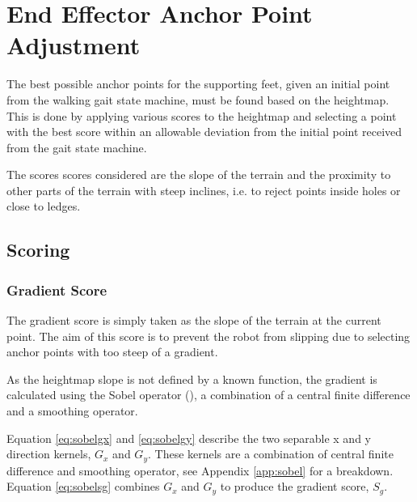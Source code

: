 \chapter{End Effector Anchor Point Adjustment} \label{chap:effector-placement}
The best possible anchor points for the supporting feet, given an initial point from the walking
gait state machine, must be found based on the heightmap. This is done by applying various
scores to the heightmap and selecting a point with the best score within an allowable
deviation from the initial point received from the gait state machine.

The scores scores considered are the slope of the terrain and the proximity to other parts of the terrain with steep inclines,
i.e. to reject points inside holes or close to ledges.


\section{Scoring}
    \subsection{Gradient Score}
        The gradient score is simply taken as the slope of the terrain at the current point. The aim of this score is to prevent the robot from slipping due to
        selecting anchor points with too steep of a gradient.
        
        As the heightmap slope is not defined by a known function, the gradient is calculated using the Sobel
        operator (\cite{sobel2014}), a combination of a central finite difference and a smoothing operator.
        
        Equation \ref{eq:sobelgx} and \ref{eq:sobelgy} describe the two separable x and y direction kernels, \(G_x\) and \(G_y\). These kernels are a combination of
        central finite difference and smoothing operator, see Appendix \ref{app:sobel} for a breakdown. Equation \ref{eq:sobelsg} combines \(G_x\) and \(G_y\)
        to produce the gradient score, \(S_g\).

